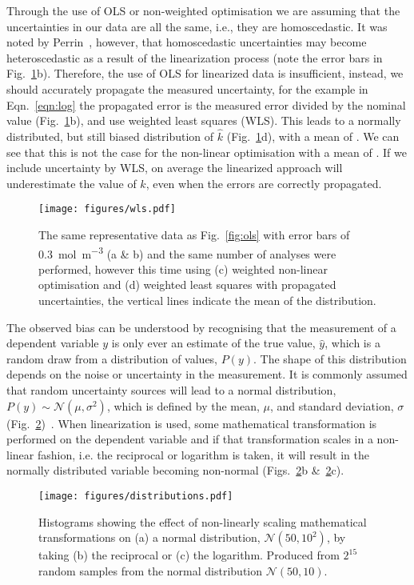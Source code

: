 \documentclass[journal=jceda8,manuscript=article]{achemso}
\begin{document}
Through the use of OLS or non-weighted optimisation we are assuming that the uncertainties in our data are all the same, i.e., they are homoscedastic. 
It was noted by Perrin~\cite{perrin_linear_2017}, however, that homoscedastic uncertainties may become heteroscedastic as a result of the linearization process (note the error bars in Fig.~\ref{fig:wls}b). 
Therefore, the use of OLS for linearized data is insufficient, instead, we should accurately propagate the measured uncertainty, for the example in Eqn.~\ref{eqn:log} the propagated error is the measured error divided by the nominal value (Fig.~\ref{fig:wls}b), and use weighted least squares (WLS).
This leads to a normally distributed, but still biased distribution of $\hat{k}$ (Fig.~\ref{fig:wls}d), with a mean of .
We can see that this is not the case for the non-linear optimisation with a mean of .
If we include uncertainty by WLS, on average the linearized approach will underestimate the value of $k$, even when the errors are correctly propagated. 
%
\begin{figure}
  \texttt{[image: figures/wls.pdf]}
  \caption{
    The same representative data as Fig.~\ref{fig:ols} with error bars of \SI{0.3}{{\mol\m^{-3}}} (a \& b) and the same number of analyses were performed, however this time using (c) weighted non-linear optimisation and (d) weighted least squares with propagated uncertainties, the vertical lines indicate the mean of the distribution. 
    }
  \label{fig:wls}
\end{figure}
%

The observed bias can be understood by recognising that the measurement of a dependent variable $y$ is only ever an estimate of the true value, $\hat{y}$, which is a random draw from a distribution of values, $P(y)$. 
The shape of this distribution depends on the noise or uncertainty in the measurement. 
It is commonly assumed that random uncertainty sources will lead to a normal distribution, $P(y) \sim \mathcal{N}(\mu, \sigma^2)$, which is defined by the mean, $\mu$, and standard deviation, $\sigma$ (Fig.~\ref{fig:distributions})~\cite{monk_math_2010}.
When linearization is used, some mathematical transformation is performed on the dependent variable and if that transformation scales in a non-linear fashion, i.e. the reciprocal or logarithm is taken, it will result in the normally distributed variable becoming non-normal (Figs.~\ref{fig:distributions}b \&~\ref{fig:distributions}c).
%
\begin{figure}
  \texttt{[image: figures/distributions.pdf]}
  \caption{
    Histograms showing the effect of non-linearly scaling mathematical transformations on (a) a normal distribution, $\mathcal{N}(50, 10^2)$, by taking (b) the reciprocal or (c) the logarithm. 
    Produced from $2^{15}$ random samples from the normal distribution $\mathcal{N}(50, 10)$.
    }
  \label{fig:distributions}
\end{figure}
%
\end{document}
